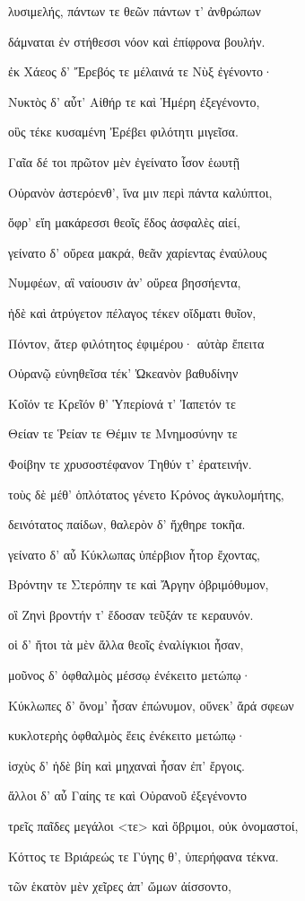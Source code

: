 \begin{pages}
\begin{Leftside}
λυσιμελής, πάντων τε θεῶν πάντων τ' ἀνθρώπων

δάμναται ἐν στήθεσσι νόον καὶ ἐπίφρονα βουλήν.

ἐκ Χάεος δ' Ἔρεβός τε μέλαινά τε Νὺξ ἐγένοντο· 

Νυκτὸς δ' αὖτ' Αἰθήρ τε καὶ Ἡμέρη ἐξεγένοντο,

οὓς τέκε κυσαμένη Ἐρέβει φιλότητι μιγεῖσα. 

Γαῖα δέ τοι πρῶτον μὲν ἐγείνατο ἶσον ἑωυτῇ

Οὐρανὸν ἀστερόενθ', ἵνα μιν περὶ πάντα καλύπτοι,

ὄφρ' εἴη μακάρεσσι θεοῖς ἕδος ἀσφαλὲς αἰεί,

γείνατο δ' οὔρεα μακρά, θεᾶν χαρίεντας ἐναύλους 

Νυμφέων, αἳ ναίουσιν ἀν' οὔρεα βησσήεντα,  

ἠδὲ καὶ ἀτρύγετον πέλαγος τέκεν οἴδματι θυῖον,

Πόντον, ἄτερ φιλότητος ἐφιμέρου· αὐτὰρ ἔπειτα

Οὐρανῷ εὐνηθεῖσα τέκ' Ὠκεανὸν βαθυδίνην 

Κοῖόν τε Κρεῖόν θ' Ὑπερίονά τ' Ἰαπετόν τε

Θείαν τε Ῥείαν τε Θέμιν τε Μνημοσύνην τε 

Φοίβην τε χρυσοστέφανον Τηθύν τ' ἐρατεινήν.

τοὺς δὲ μέθ' ὁπλότατος γένετο Κρόνος ἀγκυλομήτης,

δεινότατος παίδων, θαλερὸν δ' ἤχθηρε τοκῆα. 

γείνατο δ' αὖ Κύκλωπας ὑπέρβιον ἦτορ ἔχοντας,

Βρόντην τε Στερόπην τε καὶ Ἄργην ὀβριμόθυμον, 

οἳ Ζηνὶ βροντήν τ' ἔδοσαν τεῦξάν τε κεραυνόν.

οἱ δ' ἤτοι τὰ μὲν ἄλλα θεοῖς ἐναλίγκιοι ἦσαν,

μοῦνος δ' ὀφθαλμὸς μέσσῳ ἐνέκειτο μετώπῳ· 

Κύκλωπες δ' ὄνομ' ἦσαν ἐπώνυμον, οὕνεκ' ἄρά σφεων

κυκλοτερὴς ὀφθαλμὸς ἕεις ἐνέκειτο μετώπῳ· 

ἰσχὺς δ' ἠδὲ βίη καὶ μηχαναὶ ἦσαν ἐπ' ἔργοις.

ἄλλοι δ' αὖ Γαίης τε καὶ Οὐρανοῦ ἐξεγένοντο

τρεῖς παῖδες μεγάλοι \textless{}τε\textgreater{} καὶ ὄβριμοι, οὐκ
ὀνομαστοί, 

Κόττος τε Βριάρεώς τε Γύγης θ', ὑπερήφανα τέκνα. 

τῶν ἑκατὸν μὲν χεῖρες ἀπ' ὤμων ἀίσσοντο, 


\end{Leftside}
\end{pages}

